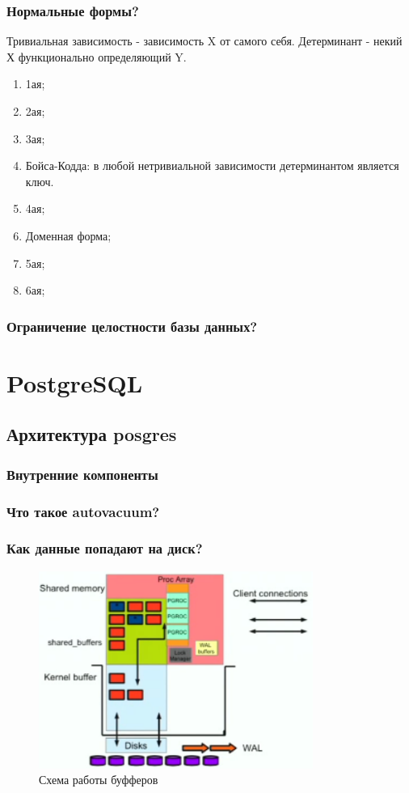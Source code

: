 \subsection{Нормальные формы?}
Тривиальная зависимость - зависимость X от самого себя. 
Детерминант - некий Х функционально определяющий Y.
\begin{enumerate}
    \item 1ая;
    \item 2ая;
    \item 3ая;
    \item Бойса-Кодда: в любой нетривиальной зависимости детерминантом является ключ.
    \item 4ая;
    \item Доменная форма;
    \item 5ая;
    \item 6ая;
\end{enumerate}
\subsection{Ограничение целостности базы данных?}

\chapter{PostgreSQL}

\section{Архитектура posgres}
\subsection{Внутренние компоненты}
\subsection{Что такое autovacuum?}
\subsection{Как данные попадают на диск?}

\begin{figure}[h!]
\centering
\includegraphics[width=0.8\textwidth]{img/postgres-scheme-buffers.png}
\caption{Схема работы буфферов}
\label{postgres-buffers}
\end{figure}

